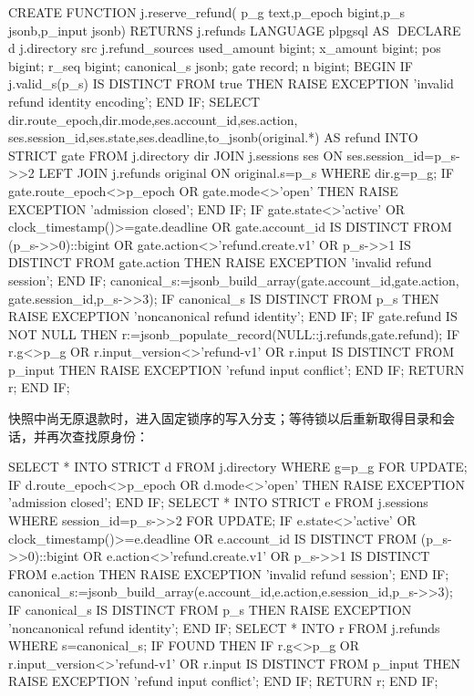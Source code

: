 \begin{BookCode}
CREATE FUNCTION j.reserve_refund(
 p_g text,p_epoch bigint,p_s jsonb,p_input jsonb)
 RETURNS j.refunds LANGUAGE plpgsql AS $$
DECLARE d j.directory%
        src j.refund_sources%
        used_amount bigint; x_amount bigint; pos bigint; r_seq bigint;
        canonical_s jsonb; gate record; n bigint;
BEGIN
 IF j.valid_s(p_s) IS DISTINCT FROM true THEN
   RAISE EXCEPTION 'invalid refund identity encoding';
 END IF;
 SELECT dir.route_epoch,dir.mode,ses.account_id,ses.action,
        ses.session_id,ses.state,ses.deadline,to_jsonb(original.*) AS refund
 INTO STRICT gate
 FROM j.directory dir JOIN j.sessions ses ON ses.session_id=p_s->>2
 LEFT JOIN j.refunds original ON original.s=p_s WHERE dir.g=p_g;
 IF gate.route_epoch<>p_epoch OR gate.mode<>'open' THEN
   RAISE EXCEPTION 'admission closed';
 END IF;
 IF gate.state<>'active' OR clock_timestamp()>=gate.deadline
    OR gate.account_id IS DISTINCT FROM (p_s->>0)::bigint
    OR gate.action<>'refund.create.v1'
    OR p_s->>1 IS DISTINCT FROM gate.action THEN
   RAISE EXCEPTION 'invalid refund session';
 END IF;
 canonical_s:=jsonb_build_array(gate.account_id,gate.action,
                               gate.session_id,p_s->>3);
 IF canonical_s IS DISTINCT FROM p_s THEN
   RAISE EXCEPTION 'noncanonical refund identity';
 END IF;
 IF gate.refund IS NOT NULL THEN
   r:=jsonb_populate_record(NULL::j.refunds,gate.refund);
   IF r.g<>p_g OR r.input_version<>'refund-v1'
      OR r.input IS DISTINCT FROM p_input THEN
     RAISE EXCEPTION 'refund input conflict';
   END IF;
   RETURN r;
 END IF;
\end{BookCode}

快照中尚无原退款时，进入固定锁序的写入分支；等待锁以后重新取得目录和会话，并再次查找原身份：

\begin{BookCode}
 SELECT * INTO STRICT d FROM j.directory WHERE g=p_g FOR UPDATE;
 IF d.route_epoch<>p_epoch OR d.mode<>'open' THEN
   RAISE EXCEPTION 'admission closed';
 END IF;
 SELECT * INTO STRICT e FROM j.sessions
  WHERE session_id=p_s->>2 FOR UPDATE;
 IF e.state<>'active' OR clock_timestamp()>=e.deadline
    OR e.account_id IS DISTINCT FROM (p_s->>0)::bigint
    OR e.action<>'refund.create.v1' OR p_s->>1 IS DISTINCT FROM e.action THEN
   RAISE EXCEPTION 'invalid refund session';
 END IF;
 canonical_s:=jsonb_build_array(e.account_id,e.action,e.session_id,p_s->>3);
 IF canonical_s IS DISTINCT FROM p_s THEN
   RAISE EXCEPTION 'noncanonical refund identity';
 END IF;
 SELECT * INTO r FROM j.refunds WHERE s=canonical_s;
 IF FOUND THEN
   IF r.g<>p_g OR r.input_version<>'refund-v1'
      OR r.input IS DISTINCT FROM p_input THEN
     RAISE EXCEPTION 'refund input conflict';
   END IF;
   RETURN r;
 END IF;
\end{BookCode}

